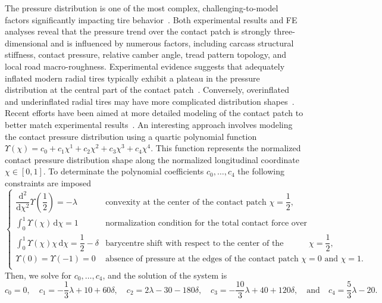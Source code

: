 The pressure distribution is one of the most complex, challenging-to-model factors significantly impacting tire behavior~\cite{savkoor1966some}. Both experimental results and \ac{FE} analyses reveal that the pressure trend over the contact patch is strongly three-dimensional and is influenced by numerous factors, including carcass structural stiffness, contact pressure, relative camber angle, tread pattern topology, and local road macro-roughness. Experimental evidence suggests that adequately inflated modern radial tires typically exhibit a plateau in the pressure distribution at the central part of the contact patch~\cite[Chapter~5]{nakajima2019advanced}. Conversely, overinflated and underinflated radial tires may have more complicated distribution shapes~\cite{nakajima2019advanced, sakai1995measurement}. Recent efforts have been aimed at more detailed modeling of the contact patch to better match experimental results~\cite{miyashita2010tire, fevrier2013method, xu2014analytical}. An interesting approach involves modeling the contact pressure distribution using a quartic polynomial function $\Upsilon(\chi) = c_0 + c_1\chi^1 + c_2\chi^2 + c_3\chi^3 + c_4\chi^4$. This function represents the normalized contact pressure distribution shape along the normalized longitudinal coordinate $\chi \in [0, 1]$. To determinate the polynomial coefficients $c_0, \dots, c_4$ the following constraints are imposed
%
\begin{equation}
  \begin{cases}
    \dfrac{\mathrm{d}^2}{\mathrm{d}\chi^2}\Upsilon\left(\dfrac{1}{2}\right) = -\lambda & \text{convexity at the center of the contact patch $\chi = \dfrac{1}{2}$,}
    \\[1em]
    \displaystyle\int_{0}^{1} \Upsilon(\chi)\,\mathrm{d}\chi = 1 & \text{normalization condition for the total contact force over the contact patch,}
    \\[1em]
    \displaystyle\int_{0}^{1} \Upsilon(\chi)\chi\,\mathrm{d}\chi = \dfrac{1}{2} - \delta & \text{barycentre shift with respect to the center of the contact patch $\chi = \dfrac{1}{2}$,}
    \\[1.5em]
    \Upsilon(0) = \Upsilon(-1) = 0 & \text{absence of pressure at the edges of the contact patch $\chi = 0$ and $\chi = 1$.}
    \\[0.5em]
  \end{cases}
  \label{app3:eq:upsilon}
\end{equation}
%
Then, we solve for $c_0, \dots, c_4$, and the solution of the system is
%
\begin{equation*}
  c_0 = 0, \quad
  c_1 = -\dfrac{1}{3}\lambda + 10 + 60\delta, \quad
  c_2 = 2\lambda - 30 - 180\delta, \quad
  c_3 = -\dfrac{10}{3}\lambda + 40 + 120\delta, \quad \text{and} \quad
  c_4 = \dfrac{5}{3}\lambda - 20.
\end{equation*}
